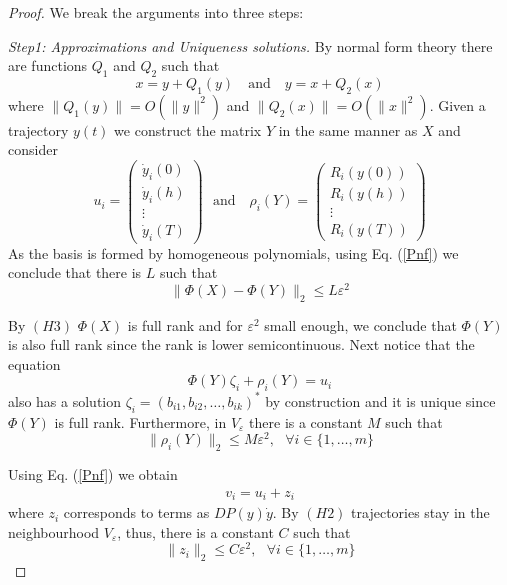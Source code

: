 \documentclass[12pt]{article}
\theoremstyle{plain}
\theoremstyle{definition}
\theoremstyle{remark}
\theoremstyle{remark}
\begin{document}
\noindent
\begin{proof} 
We break the arguments into three steps:

{\it Step1: Approximations and Uniqueness solutions.} By normal form theory there are functions $Q_1$ and $Q_2$ such that 
\begin{equation}\label{Pnf}
x  = y + Q_1(y) \mbox{~~ and ~~} y = x+ Q_2(x)
\end{equation}
where $\| Q_1(y) \| = O(\|y\|^{2})$ and $\| Q_2(x) \| = O(\|x\|^2)$. 
Given a trajectory $y(t)$ we construct the matrix $Y$ in the same manner as $X$ and consider 
$$
 u_i = \left(
\begin{array}{c}
\dot y_i(0) \\
\dot y_i(h) \\
\vdots \\
\dot y_i (T)
\end{array}
\right) \mbox{~ and ~ }
 \rho_i (Y) = \left(
\begin{array}{c}
 R_i(y(0)) \\
 R_i(y(h)) \\
\vdots \\
 R_i(y(T))
\end{array}
\right)
$$ 
As the basis is formed by homogeneous polynomials, using Eq. (\ref{Pnf}) we conclude that there is $L$ such that 
$$
\| \Phi(X) - \Phi(Y)  \|_2 \le L \varepsilon^{2}
$$
  
By $(H3)$  $\Phi(X)$ is full rank and  for  $\varepsilon^{2}$ small enough, we conclude that $\Phi(Y)$ is also full rank since the rank is lower semicontinuous.  Next notice that the equation 
\begin{equation}\label{Y}
\Phi(Y) \zeta_i + \rho_i(Y) =  u_i
\end{equation}
also has a solution $\zeta_i = (b_{i1}, b_{i2}, \dots, b_{ik})^*$ by construction and it is unique since $\Phi(Y)$ is full rank. Furthermore, in $V_{\varepsilon}$ there is a constant $M$ such that 
$$
\| \rho_i(Y)\|_2 \le M \varepsilon^{2} ,\,\,\,\, \forall i \in \{1,\dots, m\}
$$

Using Eq. (\ref{Pnf})  we obtain  
\begin{eqnarray}\label{uv}
v_i =  u_i + z_i
\end{eqnarray}
where $z_i$ corresponds to terms as  $DP(y) \dot y$.  By $(H2)$ trajectories stay in the neighbourhood $V_{\varepsilon}$, thus,  there is a constant $C$ such that 
$$
\| z_i \|_2 \le C \varepsilon^{2},\,\,\,\, \forall i \in \{1,\dots, m\}
$$



\end{proof}
\end{document}
